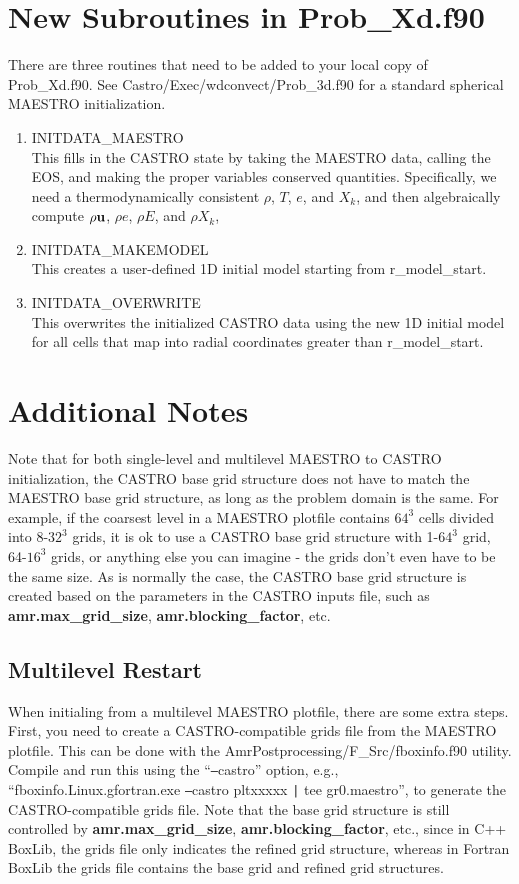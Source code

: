 \section{New Subroutines in Prob\_Xd.f90}
There are three routines that need to be added to your local copy of Prob\_Xd.f90.  See Castro/Exec/wdconvect/Prob\_3d.f90 for a standard spherical MAESTRO initialization.
\begin{enumerate}
\item INITDATA\_MAESTRO\\
This fills in the CASTRO state by taking the MAESTRO data, calling the EOS, and making the proper variables conserved quantities.  Specifically, we need a thermodynamically consistent $\rho$, $T$, $e$, and $X_k$, and then algebraically compute $\rho{\bf u}$, $\rho e$, $\rho E$, and $\rho X_k$,
\item INITDATA\_MAKEMODEL\\
This creates a user-defined 1D initial model starting from r\_model\_start.
\item INITDATA\_OVERWRITE\\
This overwrites the initialized CASTRO data using the new 1D initial model for all cells that map into radial coordinates greater than r\_model\_start.
\end{enumerate}

\section{Additional Notes}
Note that for both single-level and multilevel MAESTRO to CASTRO initialization, the CASTRO base grid structure does not have to match the MAESTRO base grid structure, as long as the problem domain is the same.  For example, if the coarsest level in a MAESTRO plotfile contains $64^3$ cells divided into 8-$32^3$ grids, it is ok to use a CASTRO base grid structure with 1-$64^3$ grid, 64-$16^3$ grids, or anything else you can imagine - the grids don't even have to be the same size.  As is normally the case, the CASTRO base grid structure is created based on the parameters in the CASTRO inputs file, such as {\bf amr.max\_grid\_size}, {\bf amr.blocking\_factor}, etc.

\subsection{Multilevel Restart}
When initialing from a multilevel MAESTRO plotfile, there are some extra steps.  First, you need to create a CASTRO-compatible grids file from the MAESTRO plotfile.  This can be done with the AmrPostprocessing/F_Src/fboxinfo.f90 utility.  
Compile and run this using the ``\texttt{--}castro'' option, e.g., 
``fboxinfo.Linux.gfortran.exe \texttt{--}castro pltxxxxx \texttt{|} tee gr0.maestro'', 
to generate the CASTRO-compatible grids file.  Note that the base grid structure is still controlled 
by {\bf amr.max\_grid\_size}, {\bf amr.blocking\_factor}, etc., 
since in C++ BoxLib, the grids file only indicates the refined grid structure, 
whereas in Fortran BoxLib the grids file contains the base grid and refined grid structures.

